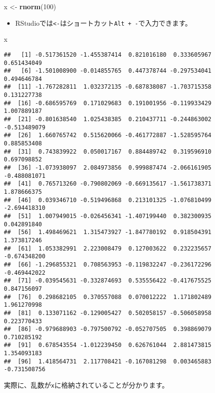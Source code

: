 \documentclass[]{bxjsarticle}
\newenvironment{Shaded}{\begin{snugshade}}{\end{snugshade}}
\newcommand{\DecValTok}[1]{\textcolor[rgb]{0.00,0.00,0.81}{#1}}
\newcommand{\KeywordTok}[1]{\textcolor[rgb]{0.13,0.29,0.53}{\textbf{#1}}}
\newcommand{\NormalTok}[1]{#1}
\newcommand{\StringTok}[1]{\textcolor[rgb]{0.31,0.60,0.02}{#1}}
\providecommand{\tightlist}{%
  \setlength{\itemsep}{0pt}\setlength{\parskip}{0pt}}
\begin{document}
\begin{Shaded}
\begin{Highlighting}[]
\NormalTok{x <-}\StringTok{ }\KeywordTok{rnorm}\NormalTok{(}\DecValTok{100}\NormalTok{)}
\end{Highlighting}
\end{Shaded}

\begin{itemize}
\tightlist
\item
  RStudioでは\texttt{\textless{}-}はショートカット\texttt{Alt\ +\ -}で入力できます。
\end{itemize}

\begin{Shaded}
\begin{Highlighting}[]
\NormalTok{x}
\end{Highlighting}
\end{Shaded}

\begin{verbatim}
##   [1] -0.517361520 -1.455387414  0.821016180  0.333605967  0.651434049
##   [6] -1.501008900 -0.014855765  0.447378744 -0.297534041  0.494646784
##  [11] -1.767282811  1.032372135 -0.687838087 -1.703715358  0.131227738
##  [16] -0.686595769  0.171029683  0.191001956 -0.119933429  1.007889187
##  [21] -0.801638540  1.025438385  0.210437711 -0.244863002 -0.513489079
##  [26]  1.660765742  0.515620066 -0.461772887 -1.528595764  0.885853408
##  [31]  0.743839922  0.050017167  0.884489742  0.319596910  0.697098852
##  [36] -1.073938097  2.084973856  0.999887474 -2.066161905 -0.488081071
##  [41]  0.765713260 -0.790802069 -0.669135617 -1.561738371  1.878666375
##  [46]  0.039346710 -0.519496868  0.213101325 -1.076810499 -2.694418310
##  [51]  1.007949015 -0.026456341 -1.407199440  0.382300935  0.042891840
##  [56]  1.498469621  1.315473927 -1.847780192  0.918504391  1.373817246
##  [61]  1.053382991  2.223008479  0.127003622  0.232235657 -0.674348200
##  [66] -1.296855321  0.708563953 -0.119832247 -0.236172296 -0.469442022
##  [71] -0.039545631 -0.332874693  0.535556422 -0.417675525  0.847156097
##  [76]  0.298682105  0.370557088  0.070012222  1.171802489  1.961270998
##  [81]  0.133071162 -0.129005427  0.502058157 -0.506058958  0.223770433
##  [86] -0.979688903 -0.797500792 -0.052707505  0.398869079  0.710285192
##  [91]  0.678543554 -1.012239450  0.626761044  2.881473815  1.354093183
##  [96]  1.418564731  2.117708421 -0.167081298  0.003465883 -0.731508756
\end{verbatim}

実際に、乱数が\texttt{x}に格納されていることが分かります。
\end{document}
